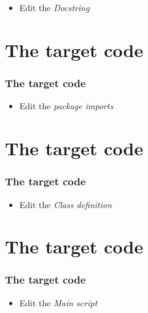 \documentclass{sdkslides}
\begin{document}
\section*{\sectionname}
\begin{frame}[t,fragile]
    \frametitle{\sectionname} 
    \begin{itemize}
        \item Edit the \emph{Docstring}
    \end{itemize}
\end{frame}

\renewcommand{\sectionname}{The target code}
\section*{\sectionname}
\nextlines[8]
\begin{frame}[t,fragile]
    \frametitle{\sectionname} 
    \begin{itemize}
        \item Edit the \emph{package imports}
    \end{itemize}
\end{frame}

\renewcommand{\sectionname}{The target code}
\section*{\sectionname}
\nextlines[52]
\begin{frame}[t,fragile]
    \frametitle{\sectionname} 
    \begin{itemize}
        \item Edit the \emph{Class definition}
    \end{itemize}
\end{frame}

\renewcommand{\sectionname}{The target code}
\section*{\sectionname}
\nextlines[45]
\begin{frame}[t,fragile]
    \frametitle{\sectionname} 
    \begin{itemize}
        \item Edit the \emph{Main script}
    \end{itemize}
\end{frame}
\end{document}
